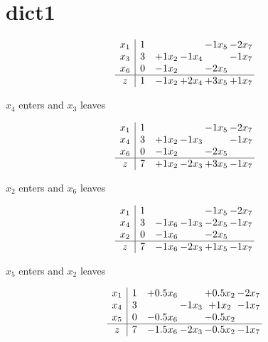 \documentclass[10pt]{article}
\begin{document}
\section{dict1}

\[\begin{array}{c| c c@{\hskip 2pt} c@{\hskip 2pt} c@{\hskip 2pt} c@{\hskip 2pt} }
 x_{1}   &  1  &    &   & -1  x_{5} & -2  x_{7}\\
 x_{3}   &  3 & + 1  x_{2} & -1  x_{4} &   & -1  x_{7}\\
 x_{6}   &  0 & -1  x_{2} &   & -2  x_{5} &   \\
\hline
z    &  1 & -1  x_{2} & + 2  x_{4} & + 3  x_{5} & + 1  x_{7}\\
\end{array}\]


 $ x_{4} $ enters and $ x_{3} $ leaves 

 \[\begin{array}{c| c c@{\hskip 2pt} c@{\hskip 2pt} c@{\hskip 2pt} c@{\hskip 2pt} }
 x_{1}   &  1  &    &   & -1  x_{5} & -2  x_{7}\\
 x_{4}   &  3 & + 1  x_{2} & -1  x_{3} &   & -1  x_{7}\\
 x_{6}   &  0 & -1  x_{2} &   & -2  x_{5} &   \\
\hline
z    &  7 & + 1  x_{2} & -2  x_{3} & + 3  x_{5} & -1  x_{7}\\
\end{array}\]


 $ x_{2} $ enters and $ x_{6} $ leaves 

 \[\begin{array}{c| c c@{\hskip 2pt} c@{\hskip 2pt} c@{\hskip 2pt} c@{\hskip 2pt} }
 x_{1}   &  1  &    &   & -1  x_{5} & -2  x_{7}\\
 x_{4}   &  3 & -1  x_{6} & -1  x_{3} & -2  x_{5} & -1  x_{7}\\
 x_{2}   &  0 & -1  x_{6} &   & -2  x_{5} &   \\
\hline
z    &  7 & -1  x_{6} & -2  x_{3} & + 1  x_{5} & -1  x_{7}\\
\end{array}\]


 $ x_{5} $ enters and $ x_{2} $ leaves 

 \[\begin{array}{c| c c@{\hskip 2pt} c@{\hskip 2pt} c@{\hskip 2pt} c@{\hskip 2pt} }
 x_{1}   &  1 & + 0.5 x_{6} &   & + 0.5 x_{2} & -2  x_{7}\\
 x_{4}   &  3  &   & -1  x_{3} & + 1  x_{2} & -1  x_{7}\\
 x_{5}   &  0 & -0.5 x_{6} &   & -0.5 x_{2} &   \\
\hline
z    &  7 & -1.5 x_{6} & -2  x_{3} & -0.5 x_{2} & -1  x_{7}\\
\end{array}\]
\end{document}
